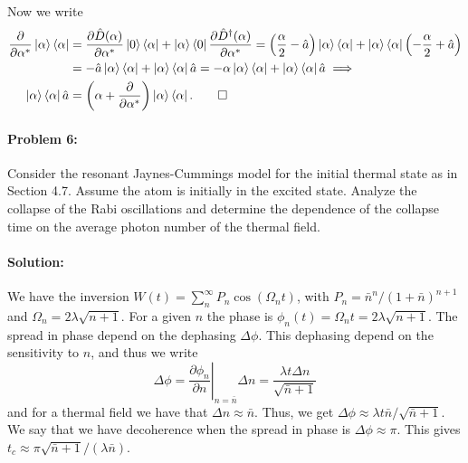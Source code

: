Now we write
\begin{align}
    \frac{\partial}{\partial\alpha^*} \ket{\alpha}\bra{\alpha} &= \frac{\partial \hat{D}(\alpha)}{\partial \alpha^*} \ket{0}\bra{\alpha} + \ket{\alpha}\bra{0} \frac{\partial \hat{D}^\dagger(\alpha)}{\partial \alpha^*} = \left(\frac{\alpha}{2} - \hat{a}\right)\ket{\alpha}\bra{\alpha} + \ket{\alpha}\bra{\alpha} \left(-\frac{\alpha}{2} + \hat{a}\right)\\
    &= -\hat{a} \ket{\alpha}\bra{\alpha} + \ket{\alpha}\bra{\alpha}\hat{a} = - \alpha \ket{\alpha}\bra{\alpha} + \ket{\alpha}\bra{\alpha}\hat{a} \implies \\
    \ket{\alpha}\bra{\alpha}\hat{a} &= \left(\alpha + \frac{\partial}{\partial \alpha^*}\right) \ket{\alpha}\bra{\alpha}.\qed
\end{align}

\paragraph{Problem 6:} Consider the resonant Jaynes-Cummings model for the initial thermal state as in Section 4.7. Assume the atom is initially in the excited state. Analyze the collapse of the Rabi oscillations and determine the dependence of the collapse time on the average photon number of the thermal field.

\paragraph{Solution:} We have the inversion $W(t) = \sum_n^\infty P_n \cos(\Omega_n t)$, with $P_n = \bar{n}^n / (1+ \bar{n})^{n+1}$ and $\Omega_n = 2\lambda \sqrt{n+1}$. For a given $n$ the phase is $\phi_n(t) = \Omega_n t = 2\lambda \sqrt{n+1}$. The spread in phase depend on the dephasing $\Delta\phi$. This dephasing depend on the sensitivity to $n$, and thus we write
\begin{equation}
    \Delta \phi = \left.\frac{\partial \phi_n}{\partial n}\right|_{n=\bar{n}} \Delta n = \frac{\lambda t \Delta n}{\sqrt{\bar{n} + 1}}
\end{equation}
and for a thermal field we have that $\Delta n \approx \bar{n}$. Thus, we get $\Delta \phi \approx \lambda t \bar{n} / \sqrt{\bar{n} + 1}$. We say that we have decoherence when the spread in phase is $\Delta \phi \approx \pi$. This gives $t_c \approx \pi \sqrt{\bar{n} + 1} /(\lambda \bar{n})$.

